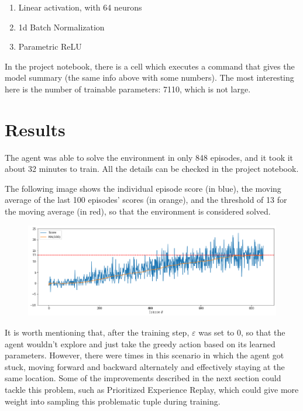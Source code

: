 \documentclass{article}
\begin{document}
\begin{enumerate}
    \item Linear activation, with 64 neurons
    \item 1d Batch Normalization
    \item Parametric ReLU \cite{he2015delving}
\end{enumerate}

In the project notebook, there is a cell which executes a command that gives the model summary (the same info above with some numbers). The most interesting here is the number of trainable parameters: 7110, which is not large.

\section{Results}

The agent was able to solve the environment in only 848 episodes, and it took it about 32 minutes to train. All the details can be checked in the project notebook.

The following image shows the individual episode score (in blue), the moving average of the last 100 episodes' scores (in orange), and the threshold of 13 for the moving average (in red), so that the environment is considered solved.

\begin{figure}[H]
\centering
\centering
\includegraphics[scale=0.5]{img/score.png}
\label{fig:score}
\end{figure}

It is worth mentioning that, after the training step, $\varepsilon$ was set to 0, so that the agent wouldn't explore and just take the greedy action based on its learned parameters. However, there were times in this scenario in which the agent got stuck, moving forward and backward alternately and effectively staying at the same location. Some of the improvements described in the next section could tackle this problem, such as Prioritized Experience Replay, which could give more weight into sampling this problematic tuple during training.
\end{document}
